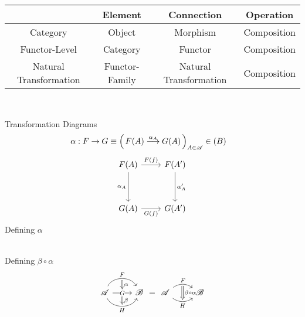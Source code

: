 \documentclass[12pt,a4paper]{report}
\newcommand{\CAT}[1]{\mathscr{#1}}
\begin{document}
\begin{tabular}{|c|c|c|c|}
	\hline
	& \textbf{Element} & \textbf{Connection} & \textbf{Operation}\\
	\hline
	Category & Object & Morphism & Composition \\
	\hline
	Functor-Level & Category & Functor & Composition \\
	\hline
	Natural Transformation & Functor-Family & Natural Transformation & Composition\\
	\hline
\end{tabular}\\
\begin{center}
{\Large{Transformation Diagrams}}\\
\begin{align*}
	\alpha &: F \to G \equiv \PAREN{F(A)\overset{\alpha_A}\longrightarrow G(A)}_{A \in \CAT{A}} \in \CAT(B) 
\end{align*}
\[
	\begin{tikzcd}[row sep=huge]
		F(A) \arrow[r, "F(f)"] \arrow[d,swap, "\alpha_A" ] & F(A') \arrow[d, "\alpha_A'"] \\
		G(A) \arrow[r, swap, "G(f)"]  & G(A')
	\end{tikzcd}
\]
Defining $\alpha$

\\
Defining $\beta\circ\alpha$
\[
\begin{tikzcd}[row sep=huge]
    \CAT{A}
     \arrow[r, bend left=65, "F"{name=F}]
     \arrow[r, "G"{inner sep=0,fill=white,anchor=center,name=G}]
     \arrow[r, bend right=65, "H"{name=H, swap}]
     \arrow[from=F.south-|G,to=G,Rightarrow,shorten=2pt,"\alpha"] 
     \arrow[from=G,to=H.north-|G,Rightarrow,shorten=2pt,"\beta"] &
   \CAT{B}
\end{tikzcd} = 
\begin{tikzcd}[row sep=huge]
	\CAT{A}
     \arrow[r, bend left=35, "F"{name=F2}]
     \arrow[r, bend right=35, "H"{name=H2, swap}]
     \arrow[from=F2.south-|H2,to=H2,Rightarrow,shorten=2pt,"\beta\circ\alpha"] &
	\CAT{B}
\end{tikzcd}
\]
\end{center}
\end{document}
